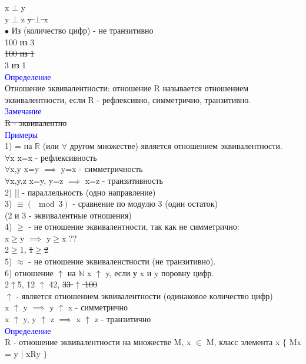 \documentclass[a4paper,12pt]{article}   %
\begin{document}
x $\bot$ y \\
y $\bot$ z \sout{y $\bot$ x} \\
$\bullet$ Из (количество цифр) - не транзитивно \\
100 из 3 \\
\sout{100 из 1} \\
3 из 1 \\
\textcolor{blue}{Определение} \\
Отношение эквивалентности: отношение R называется отношением эквивалентности, если R - рефлексивно, симметрично, транзитивно. \\
\textcolor{blue}{Замечание} \\
\sout{R - эквивалентно} \\
\textcolor{blue}{Примеры} \\
1) = на $\mathbb{R}$ (или $\forall$ другом множестве) является отношением эквивалентности. \\
$\forall$x x=x - рефлексивность \\
$\forall$x,y x=y $\implies$ y=x - симметричность \\
$\forall$x,y,z x=y, y=z $\implies$ x=z - транзитивность \\
2) || - параллельность (одно направление) \\ 
3) $\equiv (\mod 3)$ - сравнение по модулю 3 (один остаток) \\
(2 и 3 - эквивалентные отношения) \\
4) $\geqslant$ - не отношение эквивалентности, так как не симметрично: \\
x$\geqslant$y $\implies$ y$\geqslant$x ?? \\
2$\geqslant$1, \sout{1$\geqslant$2} \\
5) $\approx$ - не отношение эквиваленстности (не транзитивно). \\
6) отношение $\uparrow$ на $\mathbb{N}$ x $\uparrow$ y, если у x и y поровну цифр. \\ 
2$ \uparrow $5, 12 $\uparrow$ 42, \sout{33 $\uparrow$ 100} \\
$\uparrow$ - является отношением эквивалентности (одинаковое количество цифр) \\
x $\uparrow$ y $\implies$ y $\uparrow$ x - симметрично \\
x $\uparrow$ y, y $\uparrow$ z $\implies$ x $\uparrow$ z - транзитично \\
\textcolor{blue}{Определение} \\
R - отношение эквивалентности на множестве M, x $\in$ M, класс элемента x $\{$ Mx = y | xRy $\}$ \\
\end{document}
